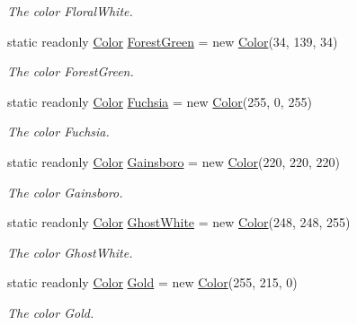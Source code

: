 \begin{DoxyCompactItemize}
\begin{DoxyCompactList}\small\item\em The color Floral\-White. \end{DoxyCompactList}\item 
static readonly \hyperlink{struct_tri_devs_1_1_tri_engine_1_1_color}{Color} \hyperlink{struct_tri_devs_1_1_tri_engine_1_1_color_af63bc7371a1abce993b11655062cc73f}{Forest\-Green} = new \hyperlink{struct_tri_devs_1_1_tri_engine_1_1_color}{Color}(34, 139, 34)
\begin{DoxyCompactList}\small\item\em The color Forest\-Green. \end{DoxyCompactList}\item 
static readonly \hyperlink{struct_tri_devs_1_1_tri_engine_1_1_color}{Color} \hyperlink{struct_tri_devs_1_1_tri_engine_1_1_color_afd4ba1d396778a11f5928f86d4ae13a2}{Fuchsia} = new \hyperlink{struct_tri_devs_1_1_tri_engine_1_1_color}{Color}(255, 0, 255)
\begin{DoxyCompactList}\small\item\em The color Fuchsia. \end{DoxyCompactList}\item 
static readonly \hyperlink{struct_tri_devs_1_1_tri_engine_1_1_color}{Color} \hyperlink{struct_tri_devs_1_1_tri_engine_1_1_color_a5b8e9c24446b08dd7738fd12b954cbd7}{Gainsboro} = new \hyperlink{struct_tri_devs_1_1_tri_engine_1_1_color}{Color}(220, 220, 220)
\begin{DoxyCompactList}\small\item\em The color Gainsboro. \end{DoxyCompactList}\item 
static readonly \hyperlink{struct_tri_devs_1_1_tri_engine_1_1_color}{Color} \hyperlink{struct_tri_devs_1_1_tri_engine_1_1_color_aac1e110a73873605a6fe2da1c0d64187}{Ghost\-White} = new \hyperlink{struct_tri_devs_1_1_tri_engine_1_1_color}{Color}(248, 248, 255)
\begin{DoxyCompactList}\small\item\em The color Ghost\-White. \end{DoxyCompactList}\item 
static readonly \hyperlink{struct_tri_devs_1_1_tri_engine_1_1_color}{Color} \hyperlink{struct_tri_devs_1_1_tri_engine_1_1_color_ad261bfb4f641fcc795c7ac4c5e0df9b5}{Gold} = new \hyperlink{struct_tri_devs_1_1_tri_engine_1_1_color}{Color}(255, 215, 0)
\begin{DoxyCompactList}\small\item\em The color Gold. \end{DoxyCompactList}\item 

\end{DoxyCompactItemize}
